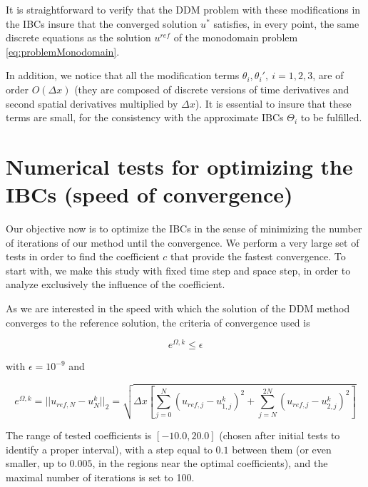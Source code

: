 \indent It is straightforward to verify that the DDM problem with these modifications in the IBCs insure that the converged solution $u^*$ satisfies, in every point, the same discrete equations as the solution $u^{ref}$ of the monodomain problem \eqref{eq:problemMonodomain}.

\indent In addition, we notice that all the modification terms $\theta_i,\theta_i', \ i = 1,2,3$, are of order $O(\Delta x)$ (they are composed of discrete versions of time derivatives and second spatial derivatives multiplied by $\Delta x$). It is essential to insure that these terms are small, for the consistency with the approximate IBCs $\Theta_i$ to be fulfilled.

\section{Numerical tests for optimizing the IBCs (speed of convergence)}
\label{sec:optim}

\indent Our objective now is to optimize the IBCs in the sense of minimizing the number of iterations of our method until the convergence. We  perform a very large set of tests in order to find the coefficient $c$  that provide the fastest convergence. To start with, we make this study with fixed time step and space step, in order to analyze exclusively the influence of the coefficient.

\indent As we are interested in the speed with which the solution of the DDM method converges to the reference solution, the criteria of convergence used is

\begin{equation*}
	e^{\Omega,k} \leq \epsilon
\end{equation*}

\noindent with $\epsilon = 10^{-9}$ and 

\begin{equation*}
	e^{\Omega,k} = ||u_{ref,N} - u^{k}_N||_2 = \sqrt{\Delta x \left[ \sum_{j=0}^N{\left(u_{ref,j} - u^{k}_{1,j}\right)^2 } + \sum_{j=N}^{2N}{\left(u_{ref,j} - u^{k}_{2,j}\right)^2 } \right] }
\end{equation*}
 
\indent {}The range of tested coefficients is $[-10.0, 20.0]$ (chosen after initial tests to identify a proper interval), with a step equal to  $0.1$ between them (or even smaller, up to $0.005$, in the regions near the optimal coefficients), and the maximal number of iterations is set to 100.

